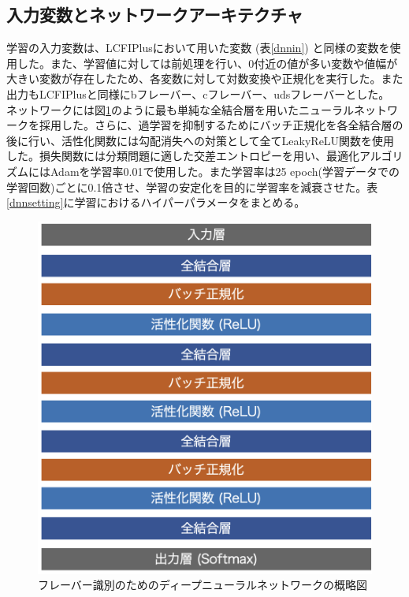 \subsection{入力変数とネットワークアーキテクチャ}
学習の入力変数は、LCFIPlusにおいて用いた変数 (表\ref{dnnin}) と同様の変数を使用した。また、学習値に対しては前処理を行い、0付近の値が多い変数や値幅が大きい変数が存在したため、各変数に対して対数変換や正規化を実行した。また出力もLCFIPlusと同様にbフレーバー、cフレーバー、udsフレーバーとした。\\
ネットワークには図\ref{dnnmodel}のように最も単純な全結合層を用いたニューラルネットワークを採用した。さらに、過学習を抑制するためにバッチ正規化を各全結合層の後に行い、活性化関数には勾配消失への対策として全てLeakyReLU関数を使用した。損失関数には分類問題に適した交差エントロピーを用い、最適化アルゴリズムにはAdamを学習率0.01で使用した。また学習率は25 epoch(学習データでの学習回数)ごとに0.1倍させ、学習の安定化を目的に学習率を減衰させた。表\ref{dnnsetting}に学習におけるハイパーパラメータをまとめる。
\begin{figure}[H]
	\begin{center}
 \includegraphics[keepaspectratio, scale=0.5]
 	{Figure/Flavortagging/dnn.png}
 		\caption{フレーバー識別のためのディープニューラルネットワークの概略図}
 		\label{dnnmodel}
	\end{center}
\end{figure}
